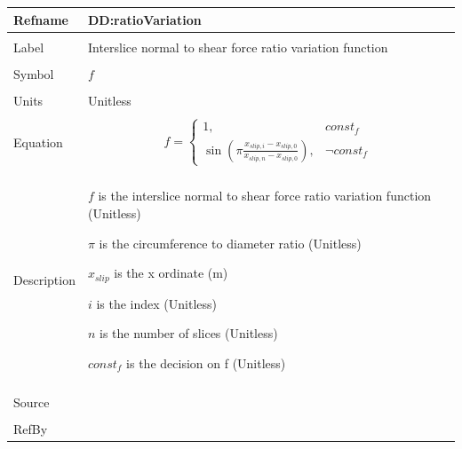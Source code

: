 \documentclass[12pt]{article}
\begin{document}
\noindent \begin{minipage}{\textwidth}
\begin{tabular}{p{} p{}}
\toprule \textbf{Refname} & \textbf{DD:ratioVariation}
\label{DD:ratioVariation}
\\ \midrule \\
Label & Interslice normal to shear force ratio variation function
        \\ \midrule \\
        Symbol & $f$
                 \\ \midrule \\
                 Units & Unitless
                         \\ \midrule \\
                         Equation & \begin{displaymath}
                                    f=\begin{cases}
1, & const_f\\
\sin\left(π \frac{{x_{slip,i}}-{x_{slip,0}}}{{x_{slip,n}}-{x_{slip,0}}}\right), & \neg{}const_f
\end{cases}
                                    \end{displaymath}
                                    \\ \midrule \\
                                    Description & \begin{symbDescription}
                                                  \item{$f$ is the interslice normal to shear force ratio variation function (Unitless)}
                                                  \item{$π$ is the circumference to diameter ratio (Unitless)}
                                                  \item{${x_{slip}}$ is the x ordinate (m)}
                                                  \item{$i$ is the index (Unitless)}
                                                  \item{$n$ is the number of slices (Unitless)}
                                                  \item{$const_f$ is the decision on f (Unitless)}
                                                  \end{symbDescription}
                                                  \\ \midrule \\
                                                  Source & \cite{fredlund1977}
                                                           \\ \midrule \\
                                                           RefBy & 
\\ \bottomrule \end{tabular}
\end{minipage}
\par~
\end{document}
